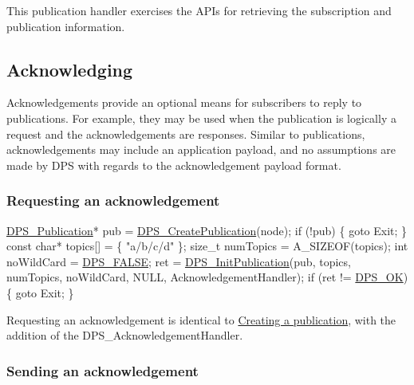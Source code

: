  This publication handler exercises the A\+P\+Is for retrieving the subscription and publication information.\hypertarget{tutorials-hello-world_acknowledging}{}\subsection{Acknowledging}\label{tutorials-hello-world_acknowledging}
Acknowledgements provide an optional means for subscribers to reply to publications. For example, they may be used when the publication is logically a request and the acknowledgements are responses. Similar to publications, acknowledgements may include an application payload, and no assumptions are made by D\+PS with regards to the acknowledgement payload format.\hypertarget{tutorials-hello-world_requesting-an-acknowledgement}{}\subsubsection{Requesting an acknowledgement}\label{tutorials-hello-world_requesting-an-acknowledgement}

\begin{DoxyCodeInclude}
    \hyperlink{group__publication_ga0d439693474aa54e27f3d45a054696ac}{DPS\_Publication}* pub = \hyperlink{group__publication_gaca070a96a6374e99a05d647c10737962}{DPS\_CreatePublication}(node);
    \textcolor{keywordflow}{if} (!pub) \{
        \textcolor{keywordflow}{goto} Exit;
    \}
    \textcolor{keyword}{const} \textcolor{keywordtype}{char}* topics[] = \{
        \textcolor{stringliteral}{"a/b/c/d"}
    \};
    \textcolor{keywordtype}{size\_t} numTopics = A\_SIZEOF(topics);
    \textcolor{keywordtype}{int} noWildCard = \hyperlink{dps_8h_ad8b397975a479b996ef223367d8835a9}{DPS\_FALSE};
    ret = \hyperlink{group__publication_ga7b0709e28cb34d5a30b90e4142cd6c19}{DPS\_InitPublication}(pub, topics, numTopics, noWildCard, NULL,
                              AcknowledgementHandler);
    \textcolor{keywordflow}{if} (ret != \hyperlink{group__status_ga0ea3dd37bc558859ae0cb5a4f79a4bdd}{DPS\_OK}) \{
        \textcolor{keywordflow}{goto} Exit;
    \}
\end{DoxyCodeInclude}
 Requesting an acknowledgement is identical to \hyperlink{tutorials-hello-world_creating-a-publication}{Creating a publication}, with the addition of the {\ttfamily D\+P\+S\+\_\+\+Acknowledgement\+Handler}.\hypertarget{tutorials-hello-world_sending-an-acknowledgement}{}\subsubsection{Sending an acknowledgement}\label{tutorials-hello-world_sending-an-acknowledgement}

